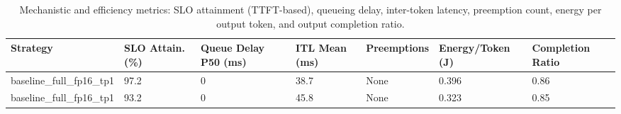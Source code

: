 \begin{table}
\caption{Mechanistic and efficiency metrics: SLO attainment (TTFT-based), queueing delay, inter-token latency, preemption count, energy per output token, and output completion ratio.}
\label{tab:efficiency}
\begin{tabular}{lllllll}
\toprule
Strategy & SLO Attain. (\%) & Queue Delay P50 (ms) & ITL Mean (ms) & Preemptions & Energy/Token (J) & Completion Ratio \\
\midrule
baseline\_full\_fp16\_tp1 & 97.2 & 0 & 38.7 & None & 0.396 & 0.86 \\
baseline\_full\_fp16\_tp1 & 93.2 & 0 & 45.8 & None & 0.323 & 0.85 \\
\bottomrule
\end{tabular}
\end{table}
